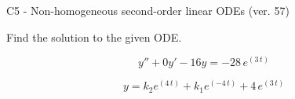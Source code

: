 \begin{exercise}
  \begin{exerciseTitle}C5 - Non-homogeneous second-order linear ODEs (ver. 57)\end{exerciseTitle}
  \begin{exerciseStatement}
    
Find the solution to the given ODE.

    
\[y''+0y'-16y = -28 \, e^{\left(3 \, t\right)}\]

  \end{exerciseStatement}
  \begin{exerciseAnswer}
    
\[y= k_{2} e^{\left(4 \, t\right)} + k_{1} e^{\left(-4 \, t\right)} + 4 \, e^{\left(3 \, t\right)}\]

  \end{exerciseAnswer}
\end{exercise}